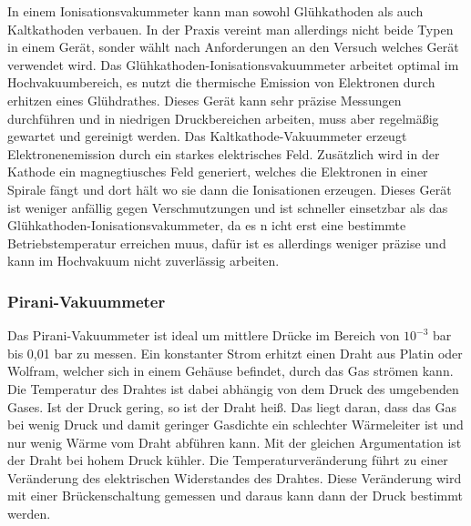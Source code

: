 In einem Ionisationsvakummeter kann man sowohl Glühkathoden als auch Kaltkathoden verbauen. In der Praxis 
vereint man allerdings nicht  beide Typen in einem Gerät, sonder wählt nach Anforderungen an den Versuch welches
Gerät verwendet wird. Das Glühkathoden-Ionisationsvakuummeter arbeitet optimal im Hochvakuumbereich, es nutzt die thermische Emission von Elektronen
durch erhitzen eines Glühdrathes. Dieses Gerät kann sehr präzise Messungen durchführen und in niedrigen Druckbereichen arbeiten,
muss aber regelmäßig gewartet und gereinigt werden. Das Kaltkathode-Vakuummeter erzeugt Elektronenemission durch ein starkes elektrisches Feld.
Zusätzlich wird in der Kathode ein magnegtiusches Feld generiert, welches die Elektronen in einer Spirale fängt und dort hält wo sie dann die
Ionisationen  erzeugen. Dieses Gerät ist weniger anfällig gegen Verschmutzungen und ist schneller einsetzbar als das Glühkathoden-Ionisationsvakummeter,
da es n icht erst eine bestimmte Betriebstemperatur erreichen muus, dafür ist es allerdings weniger präzise und kann im Hochvakuum nicht zuverlässig arbeiten.


\subsubsection{Pirani-Vakuummeter}
Das Pirani-Vakuummeter ist ideal um mittlere Drücke im Bereich von $10^{-3}$ bar bis 0,01 bar zu messen.
Ein konstanter Strom erhitzt einen Draht aus Platin oder Wolfram, welcher sich in einem Gehäuse befindet, durch das Gas strömen kann.
Die Temperatur des Drahtes ist dabei abhängig von dem Druck des umgebenden Gases. Ist der Druck gering, so ist der Draht heiß.
Das liegt daran, dass das Gas bei wenig Druck und damit geringer Gasdichte ein schlechter Wärmeleiter ist und nur wenig Wärme vom 
Draht abführen kann. Mit der gleichen Argumentation ist der Draht bei hohem Druck kühler. Die Temperaturveränderung führt zu einer Veränderung
des elektrischen Widerstandes des Drahtes. Diese Veränderung wird mit einer Brückenschaltung gemessen und daraus kann dann der Druck bestimmt werden.



